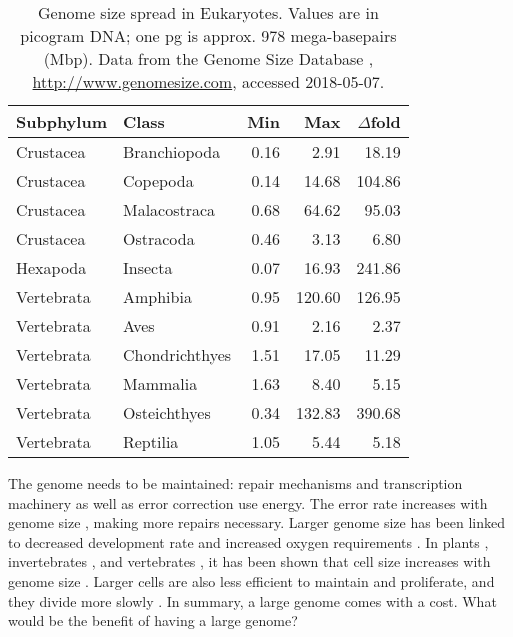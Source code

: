\begin{table}[h]
\centering
\caption{Genome size spread in Eukaryotes. Values are in picogram DNA;
one pg is approx. 978 mega-basepairs (Mbp). Data from the Genome Size
Database \citep{Gregory2018}, \url{http://www.genomesize.com}, accessed
2018-05-07.}
\label{tab:genome-size-spread}
\begin{tabular}{@{}llrrr@{}}
\toprule
Subphylum  & Class              & Min  & Max    & $\Delta$fold  \\
\midrule
Crustacea  & Branchiopoda       & 0.16 &   2.91 &  18.19        \\
Crustacea  & Copepoda           & 0.14 &  14.68 & 104.86        \\
Crustacea  & Malacostraca       & 0.68 &  64.62 &  95.03        \\
Crustacea  & Ostracoda          & 0.46 &   3.13 &   6.80        \\
Hexapoda   & Insecta            & 0.07 &  16.93 & 241.86        \\
Vertebrata & Amphibia           & 0.95 & 120.60 & 126.95        \\
Vertebrata & Aves               & 0.91 &   2.16 &   2.37        \\
Vertebrata & Chondrichthyes     & 1.51 &  17.05 &  11.29        \\
Vertebrata & Mammalia           & 1.63 &   8.40 &   5.15        \\
Vertebrata & Osteichthyes       & 0.34 & 132.83 & 390.68        \\
Vertebrata & Reptilia           & 1.05 &   5.44 &   5.18        \\
\bottomrule
\end{tabular}
\end{table}

The genome needs to be maintained: repair mechanisms and transcription
machinery as well as error correction use energy. The error rate
increases with genome size \citep{Wielgoss2011}, making more repairs
necessary. Larger genome size has been linked to decreased development
rate \citep{White2000} and increased oxygen requirements
\citep{Vinogradov1997, Gregory2002}. In plants \citep{Grime1983},
invertebrates \citep{Gregory2005}, and vertebrates \citep{Horner1983,
Olmo1982, Gregory2000}, it has been shown that cell size increases with
genome size \citep{Dufresne2011}. Larger cells are also less efficient to
maintain and proliferate, and they divide more slowly
\citep{Bennett1977}. In summary, a large genome comes with a cost. What
would be the benefit of having a large genome?

